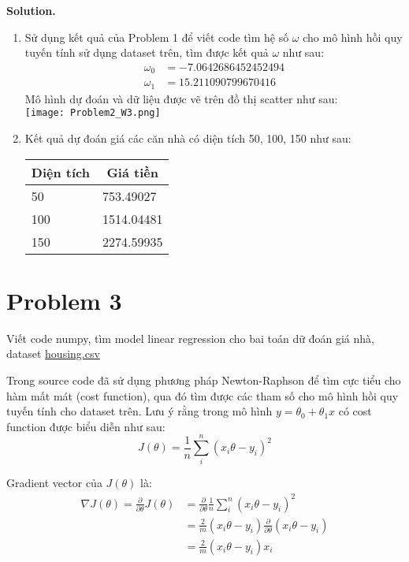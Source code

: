 \documentclass[a4paper, 12pt]{article}  %
\begin{document}
\textbf{Solution.} 
\begin{enumerate}[label=\alph*.]
    \item Sử dụng kết quả của Problem 1 để viết code tìm hệ số $\omega$ cho mô hình hồi quy tuyến tính sử dụng dataset trên, tìm được kết quả $\omega$ như sau:
    \begin{align*}
        \omega_0 &= -7.0642686452452494\\
        \omega_1 &= 15.211090799670416
    \end{align*}
    Mô hình dự đoán và dữ liệu được vẽ trên đồ thị scatter như sau:\\
    \texttt{[image: Problem2\_W3.png]}
    \item Kết quả dự đoán giá các căn nhà có diện tích 50, 100, 150 như sau:
\begin{center}
 \begin{tabular}{ll}
\multicolumn{1}{c}{Diện tích} & \multicolumn{1}{c}{Giá tiền} \\ \hline
50     &  753.49027\\
100     &  1514.04481\\ 
150    &   2274.59935\\
\end{tabular}  
\end{center}
\end{enumerate}


\section{Problem 3}
Viết code numpy, tìm model linear regression cho bai toán dữ đoán giá nhà, dataset \href{https://www.kaggle.com/prasadperera/the-boston-housing-dataset}{housing.csv}

Trong source code đã sử dụng phương pháp Newton-Raphson để tìm cực tiểu cho hàm mất mát (cost function), qua đó tìm được các tham số cho mô hình hồi quy tuyến tính cho dataset trên. Lưu ý rằng trong mô hình \(y = \theta_0 + \theta_1 x\) có cost function được biểu diễn như sau:
\[J(\theta) = \frac{1}{n} \sum^n_i (x_i \theta - y_i)^2\]

Gradient vector của $J(\theta)$ là:
\begin{align*}
    \nabla J(\theta) = \frac{\partial}{\partial \theta} J(\theta) &= \frac{\partial}{\partial \theta} \frac{1}{n} \sum^n_i (x_i \theta - y_i)^2\\
    &= \frac{2}{m} (x_i \theta - y_i) \frac{\partial}{\partial \theta} (x_i \theta - y_i) \\
    &= \frac{2}{m} (x_i \theta - y_i) x_i
\end{align*}
\end{document}

